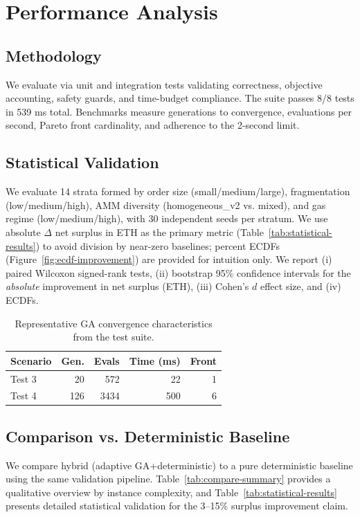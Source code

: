 \documentclass[11pt]{article}
\newcommand{\1}{\mathbf{1}}  %
\begin{document}
\section{Performance Analysis}
\label{sec:performance}
\subsection{Methodology}
We evaluate via unit and integration tests validating correctness, objective accounting, safety guards, and time-budget compliance. The suite passes 8/8 tests in 539 ms total. Benchmarks measure generations to convergence, evaluations per second, Pareto front cardinality, and adherence to the 2-second limit.

\subsection{Statistical Validation}
We evaluate 14 strata formed by order size (small/medium/large), fragmentation (low/medium/high), AMM diversity (homogeneous\_v2 vs. mixed), and gas regime (low/medium/high), with 30 independent seeds per stratum. We use absolute $\Delta$ net surplus in ETH as the primary metric (Table~\ref{tab:statistical-results}) to avoid division by near-zero baselines; percent ECDFs (Figure~\ref{fig:ecdf-improvement}) are provided for intuition only. We report (i) paired Wilcoxon signed-rank tests, (ii) bootstrap 95\% confidence intervals for the \emph{absolute} improvement in net surplus (ETH), (iii) Cohen's $d$ effect size, and (iv) ECDFs.

\begin{table}[t]
\centering
\small
\begin{tabular}{lrrrr}
\toprule
Scenario & Gen. & Evals & Time (ms) & Front \\ \midrule
Test 3 & 20 & 572 & 22 & 1 \\
Test 4 & 126 & 3434 & 500 & 6 \\
\bottomrule
\end{tabular}
\caption{Representative GA convergence characteristics from the test suite.}
\label{tab:convergence}
\end{table}

\subsection{Comparison vs. Deterministic Baseline}
We compare hybrid (adaptive GA+deterministic) to a pure deterministic baseline using the same validation pipeline. Table~\ref{tab:compare-summary} provides a qualitative overview by instance complexity, and Table~\ref{tab:statistical-results} presents detailed statistical validation for the 3--15\% surplus improvement claim.
\end{document}
